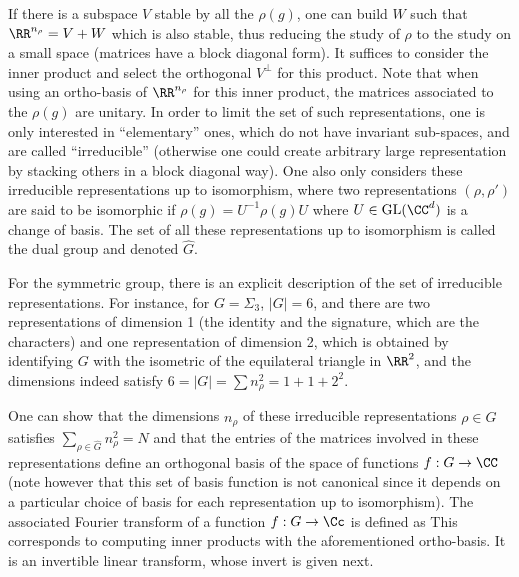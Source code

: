 If there is a subspace $V$ stable by all the $\rho(g)$, one can build $W$ such that $\RR^{n_\rho}=V+W$ which is also stable, thus reducing the study of $\rho$ to the study on a small space (matrices have a block diagonal form). It suffices to consider the inner product
and select the orthogonal $V^\bot$ for this product. Note that when using an ortho-basis of $\RR^{n_\rho}$ for this inner product, the matrices associated to the $\rho(g)$ are unitary.
%
In order to limit the set of such representations, one is only interested in ``elementary'' ones, which do not have invariant sub-spaces, and are called ``irreducible'' (otherwise one could create arbitrary large representation by stacking others in a block diagonal way). 
%
One also only considers these irreducible representations up to isomorphism, where two representations $(\rho,\rho')$ are said to be isomorphic if $\rho(g) = U^{-1} \rho(g) U$ where $U \in \text{GL}(\CC^d)$ is a change of basis. The set of all these representations up to isomorphism is called the dual group and denoted $\hat G$.

For the symmetric group, there is an explicit description of the set of irreducible representations.  
%
For instance, for $G=\Sigma_3$, $|G|=6$, and there are two representations of dimension 1 (the identity and the signature, which are the characters) and one representation of dimension 2, which is obtained by identifying $G$ with the isometric of the equilateral triangle in $\RR^2$, and the dimensions indeed satisfy $6 = |G| = \sum n_\rho^2 = 1+1+2^2$. 

One can show that the dimensions $n_\rho$ of these irreducible representations $\rho \in \hat G$ satisfies $\sum_{\rho \in \hat G} n_\rho^2 = N$ and that the entries of the matrices involved in these representations define an orthogonal basis of the space of functions $f : G \rightarrow \CC$ (note however that this set of basis function is not canonical since it depends on a particular choice of basis for each representation up to isomorphism).
%
The associated Fourier transform of a function $f : G \rightarrow \Cc$ is defined as
This corresponds to computing inner products with the aforementioned ortho-basis.
%
It is an invertible linear transform, whose invert is given next.

